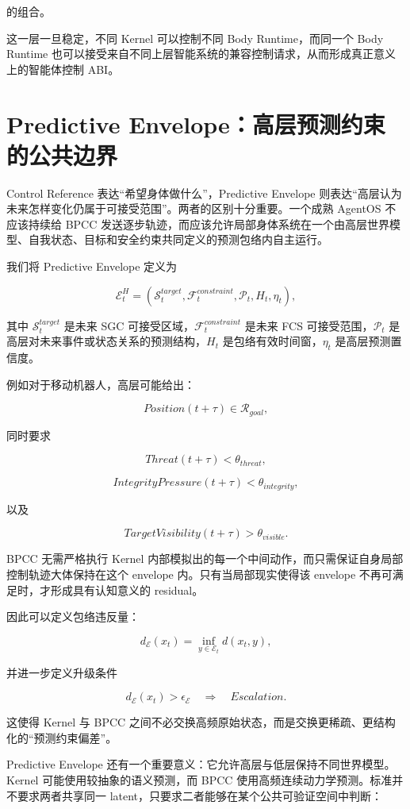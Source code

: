的组合。

这一层一旦稳定，不同 Kernel 可以控制不同 Body Runtime，而同一个 Body Runtime 也可以接受来自不同上层智能系统的兼容控制请求，从而形成真正意义上的智能体控制 ABI。

\section{Predictive Envelope：高层预测约束的公共边界}

Control Reference 表达``希望身体做什么''，Predictive Envelope 则表达``高层认为未来怎样变化仍属于可接受范围''。两者的区别十分重要。一个成熟 AgentOS 不应该持续给 BPCC 发送逐步轨迹，而应该允许局部身体系统在一个由高层世界模型、自我状态、目标和安全约束共同定义的预测包络内自主运行。

我们将 Predictive Envelope 定义为

\[
\mathcal E_t^H
=
\left(
\mathcal S_t^{target},
\mathcal F_t^{constraint},
\mathcal P_t,
H_t,
\eta_t
\right),
\]

其中 $\mathcal S_t^{target}$ 是未来 SGC 可接受区域，$\mathcal F_t^{constraint}$ 是未来 FCS 可接受范围，$\mathcal P_t$ 是高层对未来事件或状态关系的预测结构，$H_t$ 是包络有效时间窗，$\eta_t$ 是高层预测置信度。

例如对于移动机器人，高层可能给出：

\[
Position(t+\tau)\in\mathcal R_{goal},
\]

同时要求

\[
Threat(t+\tau)<\theta_{threat},
\]

\[
IntegrityPressure(t+\tau)<\theta_{integrity},
\]

以及

\[
TargetVisibility(t+\tau)>\theta_{visible}.
\]

BPCC 无需严格执行 Kernel 内部模拟出的每一个中间动作，而只需保证自身局部控制轨迹大体保持在这个 envelope 内。只有当局部现实使得该 envelope 不再可满足时，才形成具有认知意义的 residual。

因此可以定义包络违反量：

\[
d_{\mathcal E}(x_t)
=
\inf_{y\in\mathcal E_t}
d(x_t,y),
\]

并进一步定义升级条件

\[
d_{\mathcal E}(x_t)>\epsilon_{\mathcal E}
\quad\Longrightarrow\quad
Escalation.
\]

这使得 Kernel 与 BPCC 之间不必交换高频原始状态，而是交换更稀疏、更结构化的``预测约束偏差''。

Predictive Envelope 还有一个重要意义：它允许高层与低层保持不同世界模型。Kernel 可能使用较抽象的语义预测，而 BPCC 使用高频连续动力学预测。标准并不要求两者共享同一 latent，只要求二者能够在某个公共可验证空间中判断：

